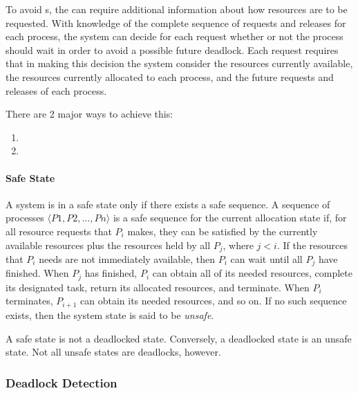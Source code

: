 To avoid s, the  can require additional information about how resources are to be requested.
With knowledge of the complete sequence of requests and releases for each process, the system can decide for each request whether or not the process should wait in order to avoid a possible future deadlock.
Each request requires that in making this decision the system consider the resources currently available, the resources currently allocated to each process, and the future requests and releases of each process.

There are 2 major ways to achieve this:
\begin{enumerate}[noitemsep]
\item {}
\item {}
\end{enumerate}

\paragraph{Safe State}\label{par:Deadlock_Avoidance-Safe_State}
A system is in a safe state only if there exists a safe sequence.
A sequence of processes $\langle P 1, P 2 , \ldots, P n \rangle$ is a safe sequence for the current allocation state if, for all resource requests that $P_{i}$ makes, they can be satisfied by the currently available resources plus the resources held by all $P_{j}$, where $j < i$.
If the resources that $P_{i}$ needs are not immediately available, then $P_{i}$ can wait until all $P_{j}$ have finished.
When $P_{j}$ has finished, $P_{i}$ can obtain all of its needed resources, complete its designated task, return its allocated resources, and terminate.
When $P_{i}$ terminates, $P_{i+1}$ can obtain its needed resources, and so on.
If no such sequence exists, then the system state is said to be \emph{unsafe}.

\begin{blackbox}
  A safe state is not a deadlocked state.
  Conversely, a deadlocked state is an unsafe state.
  Not all unsafe states are deadlocks, however.
\end{blackbox}

\subsubsection{Deadlock Detection}\label{subsubsec:Deadlock_Detection}

